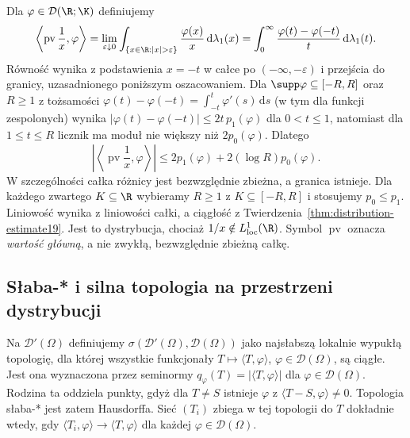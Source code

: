 \begin{przyklad}
\label{ex:principal-value19}
Dla $\varphi\in\mathcal D(\R;\K)$ definiujemy
\[\left\langle\operatorname{pv}\frac1x,\varphi\right\rangle
=\lim_{\varepsilon\downarrow0}
\int_{\{x\in\R:|x|>\varepsilon\}}
\frac{\varphi(x)}{x}\,\mathrm d\lambda_1(x)
=\int_0^\infty\frac{\varphi(t)-\varphi(-t)}{t}\,
\mathrm d\lambda_1(t).\]
Równość wynika z podstawienia $x=-t$ w całce
po $(-\infty,-\varepsilon)$ i przejścia do granicy,
uzasadnionego poniższym oszacowaniem.
Dla $\supp\varphi\subseteq[-R,R]$ oraz $R\ge1$
z tożsamości $\varphi(t)-\varphi(-t)=\int_{-t}^t\varphi'(s)\,\mathrm ds$
(w tym dla funkcji zespolonych) wynika
$|\varphi(t)-\varphi(-t)|\le2t\,p_1(\varphi)$ dla
$0<t\le1$, natomiast dla $1\le t\le R$ licznik
ma moduł nie większy niż $2p_0(\varphi)$. Dlatego
\[\left|\left\langle\operatorname{pv}\frac1x,
\varphi\right\rangle\right|\le
2p_1(\varphi)+2(\log R)p_0(\varphi).\]
W szczególności całka różnicy jest bezwzględnie zbieżna,
a granica istnieje. Dla każdego zwartego $K\subseteq\R$
wybieramy $R\ge1$ z $K\subseteq[-R,R]$ i stosujemy
$p_0\le p_1$. Liniowość wynika z liniowości całki,
a ciągłość z Twierdzenia~\ref{thm:distribution-estimate19}.
Jest to dystrybucja, chociaż $1/x\notin L^1_{\mathrm{loc}}(\R)$.
Symbol $\operatorname{pv}$ oznacza \emph{wartość główną},
a nie zwykłą, bezwzględnie zbieżną całkę.
\end{przyklad}

\subsection{Słaba-* i silna topologia na przestrzeni dystrybucji}

\begin{definicja}
\label{def:weakstar19}
Na $\mathcal D'(\Omega)$ definiujemy
$\sigma(\mathcal D'(\Omega),\mathcal D(\Omega))$ jako
najsłabszą lokalnie wypukłą topologię, dla której
wszystkie funkcjonały $T\mapsto\langle T,\varphi\rangle$,
$\varphi\in\mathcal D(\Omega)$, są ciągłe.
Jest ona wyznaczona przez seminormy
$q_\varphi(T)=|\langle T,\varphi\rangle|$ dla $\varphi\in\mathcal D(\Omega)$.
Rodzina ta oddziela punkty, gdyż dla $T\ne S$ istnieje
$\varphi$ z $\langle T-S,\varphi\rangle\ne0$.
Topologia słaba-* jest zatem Hausdorffa.
Sieć $(T_i)$ zbiega w tej topologii do $T$ dokładnie wtedy,
gdy $\langle T_i,\varphi\rangle\to\langle T,\varphi\rangle$
dla każdej $\varphi\in\mathcal D(\Omega)$.
\end{definicja}

